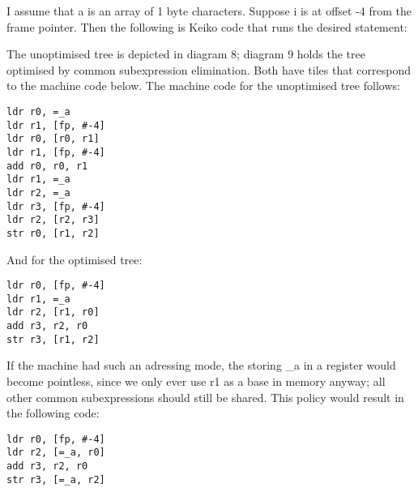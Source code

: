 I assume that a is an array of 1 byte characters. Suppose i is at offset -4 from the frame pointer. Then the following is Keiko code that runs the desired statement:


The unoptimised tree is depicted in diagram 8; diagram 9 holds the tree optimised by common subexpression elimination. Both have tiles that correspond to the machine code below. The machine code for the unoptimised tree follows:

\begin{lstlisting}
ldr r0, =_a
ldr r1, [fp, #-4]
ldr r0, [r0, r1]
ldr r1, [fp, #-4]
add r0, r0, r1
ldr r1, =_a
ldr r2, =_a
ldr r3, [fp, #-4]
ldr r2, [r2, r3]
str r0, [r1, r2]
\end{lstlisting}

And for the optimised tree:

\begin{lstlisting}
ldr r0, [fp, #-4]
ldr r1, =_a
ldr r2, [r1, r0]
add r3, r2, r0
str r3, [r1, r2]
\end{lstlisting}

If the machine had such an adressing mode, the storing \_a in a register would become pointless, since we only ever use r1 as a base in memory anyway; all other common subexpressions should still be shared. This policy would result in the following code:

\begin{lstlisting}
ldr r0, [fp, #-4]
ldr r2, [=_a, r0]
add r3, r2, r0
str r3, [=_a, r2]
\end{lstlisting}

\subsection{}

